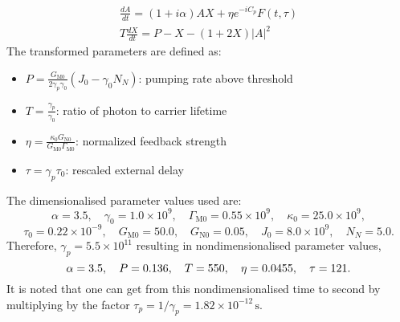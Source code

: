 %
\[
\begin{gathered}
\frac{d A}{d t} = (1 + i \alpha) A X + \eta e^{-i C_p} F(t,\tau) \\
T \frac{d X}{d t} = P - X - (1 + 2X)|A|^2
\end{gathered}
\]
%
The transformed parameters are defined as:
%
\begin{itemize}
  \item \( P = \frac{G_{\mathrm{M}0}}{2 \gamma_p \gamma_0}(J_0 - \gamma_0 N_N) \): pumping rate above threshold
  \item \( T = \frac{\gamma_p}{\gamma_0} \): ratio of photon to carrier lifetime
  \item \( \eta = \frac{\kappa_0 G_{\mathrm{N}0}}{G_{\mathrm{M}0} \Gamma_{\mathrm{M}0}} \): normalized feedback strength
  \item \( \tau = \gamma_p \tau_0 \): rescaled external delay
\end{itemize}
%
The dimensionalised parameter values used are:
%
\[
\alpha = 3.5, \quad \gamma_0 = 1.0 \times 10^9, \quad \Gamma_{\mathrm{M}0} = 0.55 \times 10^9, \quad \kappa_0 = 25.0 \times 10^9,
\]
\[
\tau_0 = 0.22 \times 10^{-9}, \quad G_{\mathrm{M}0} = 50.0, \quad G_{\mathrm{N}0} = 0.05, \quad J_0 = 8.0 \times 10^9, \quad N_N = 5.0.
\]
Therefore, $\gamma_p = 5.5 \times 10^{11}$ resulting in nondimensionalised parameter values,
\[
\alpha = 3.5, \quad P = 0.136, \quad T = 550, \quad \eta = 0.0455, \quad \tau = 121.
\]
%
It is noted that one can get from this nondimensionalised time to second by multiplying by the factor $\tau_p = 1/\gamma_p = 1.82 \times 10^{-12}\,\text{s}$.
%
%
